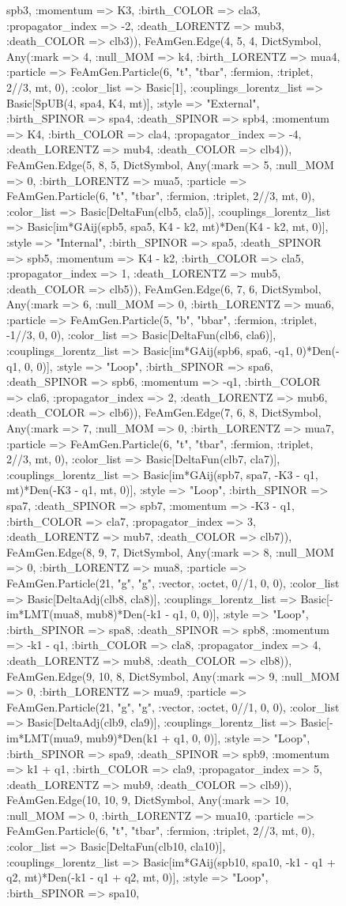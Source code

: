 \documentclass{revtex4}
\begin{document}
\begin{figure}[!htb]
\begin{center}
{spb3, :momentum => K3, :birth_COLOR => cla3, :propagator_index => -2, :death_LORENTZ => mub3, :death_COLOR => clb3)), FeAmGen.Edge(4, 5, 4, Dict{Symbol, Any}(:mark => 4, :null_MOM => k4, :birth_LORENTZ => mua4, :particle => FeAmGen.Particle(6, "t", "tbar", :fermion, :triplet, 2//3, mt, 0), :color_list => Basic[1], :couplings_lorentz_list => Basic[SpUB(4, spa4, K4, mt)], :style => "External", :birth_SPINOR => spa4, :death_SPINOR => spb4, :momentum => K4, :birth_COLOR => cla4, :propagator_index => -4, :death_LORENTZ => mub4, :death_COLOR => clb4)), FeAmGen.Edge(5, 8, 5, Dict{Symbol, Any}(:mark => 5, :null_MOM => 0, :birth_LORENTZ => mua5, :particle => FeAmGen.Particle(6, "t", "tbar", :fermion, :triplet, 2//3, mt, 0), :color_list => Basic[DeltaFun(clb5, cla5)], :couplings_lorentz_list => Basic[im*GAij(spb5, spa5, K4 - k2, mt)*Den(K4 - k2, mt, 0)], :style => "Internal", :birth_SPINOR => spa5, :death_SPINOR => spb5, :momentum => K4 - k2, :birth_COLOR => cla5, :propagator_index => 1, :death_LORENTZ => mub5, :death_COLOR => clb5)), FeAmGen.Edge(6, 7, 6, Dict{Symbol, Any}(:mark => 6, :null_MOM => 0, :birth_LORENTZ => mua6, :particle => FeAmGen.Particle(5, "b", "bbar", :fermion, :triplet, -1//3, 0, 0), :color_list => Basic[DeltaFun(clb6, cla6)], :couplings_lorentz_list => Basic[im*GAij(spb6, spa6, -q1, 0)*Den(-q1, 0, 0)], :style => "Loop", :birth_SPINOR => spa6, :death_SPINOR => spb6, :momentum => -q1, :birth_COLOR => cla6, :propagator_index => 2, :death_LORENTZ => mub6, :death_COLOR => clb6)), FeAmGen.Edge(7, 6, 8, Dict{Symbol, Any}(:mark => 7, :null_MOM => 0, :birth_LORENTZ => mua7, :particle => FeAmGen.Particle(6, "t", "tbar", :fermion, :triplet, 2//3, mt, 0), :color_list => Basic[DeltaFun(clb7, cla7)], :couplings_lorentz_list => Basic[im*GAij(spb7, spa7, -K3 - q1, mt)*Den(-K3 - q1, mt, 0)], :style => "Loop", :birth_SPINOR => spa7, :death_SPINOR => spb7, :momentum => -K3 - q1, :birth_COLOR => cla7, :propagator_index => 3, :death_LORENTZ => mub7, :death_COLOR => clb7)), FeAmGen.Edge(8, 9, 7, Dict{Symbol, Any}(:mark => 8, :null_MOM => 0, :birth_LORENTZ => mua8, :particle => FeAmGen.Particle(21, "g", "g", :vector, :octet, 0//1, 0, 0), :color_list => Basic[DeltaAdj(clb8, cla8)], :couplings_lorentz_list => Basic[-im*LMT(mua8, mub8)*Den(-k1 - q1, 0, 0)], :style => "Loop", :birth_SPINOR => spa8, :death_SPINOR => spb8, :momentum => -k1 - q1, :birth_COLOR => cla8, :propagator_index => 4, :death_LORENTZ => mub8, :death_COLOR => clb8)), FeAmGen.Edge(9, 10, 8, Dict{Symbol, Any}(:mark => 9, :null_MOM => 0, :birth_LORENTZ => mua9, :particle => FeAmGen.Particle(21, "g", "g", :vector, :octet, 0//1, 0, 0), :color_list => Basic[DeltaAdj(clb9, cla9)], :couplings_lorentz_list => Basic[-im*LMT(mua9, mub9)*Den(k1 + q1, 0, 0)], :style => "Loop", :birth_SPINOR => spa9, :death_SPINOR => spb9, :momentum => k1 + q1, :birth_COLOR => cla9, :propagator_index => 5, :death_LORENTZ => mub9, :death_COLOR => clb9)), FeAmGen.Edge(10, 10, 9, Dict{Symbol, Any}(:mark => 10, :null_MOM => 0, :birth_LORENTZ => mua10, :particle => FeAmGen.Particle(6, "t", "tbar", :fermion, :triplet, 2//3, mt, 0), :color_list => Basic[DeltaFun(clb10, cla10)], :couplings_lorentz_list => Basic[im*GAij(spb10, spa10, -k1 - q1 + q2, mt)*Den(-k1 - q1 + q2, mt, 0)], :style => "Loop", :birth_SPINOR => spa10, }
\end{center}
\end{figure}
\end{document}

